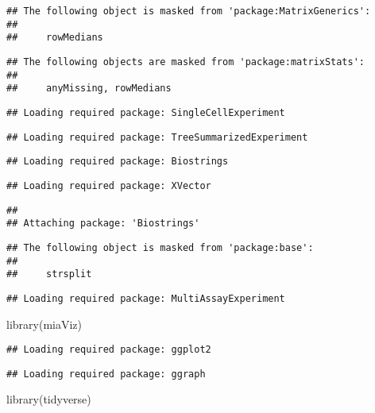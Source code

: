\documentclass[
  oneside]{book}
\newenvironment{Shaded}{\begin{snugshade}}{\end{snugshade}}
\newcommand{\FunctionTok}[1]{\textcolor[rgb]{0.00,0.00,0.00}{#1}}
\newcommand{\NormalTok}[1]{#1}
\begin{document}
\begin{verbatim}
## The following object is masked from 'package:MatrixGenerics':
## 
##     rowMedians
\end{verbatim}

\begin{verbatim}
## The following objects are masked from 'package:matrixStats':
## 
##     anyMissing, rowMedians
\end{verbatim}

\begin{verbatim}
## Loading required package: SingleCellExperiment
\end{verbatim}

\begin{verbatim}
## Loading required package: TreeSummarizedExperiment
\end{verbatim}

\begin{verbatim}
## Loading required package: Biostrings
\end{verbatim}

\begin{verbatim}
## Loading required package: XVector
\end{verbatim}

\begin{verbatim}
## 
## Attaching package: 'Biostrings'
\end{verbatim}

\begin{verbatim}
## The following object is masked from 'package:base':
## 
##     strsplit
\end{verbatim}

\begin{verbatim}
## Loading required package: MultiAssayExperiment
\end{verbatim}

\begin{Shaded}
\begin{Highlighting}[]
\FunctionTok{library}\NormalTok{(miaViz)}
\end{Highlighting}
\end{Shaded}

\begin{verbatim}
## Loading required package: ggplot2
\end{verbatim}

\begin{verbatim}
## Loading required package: ggraph
\end{verbatim}

\begin{Shaded}
\begin{Highlighting}[]
\FunctionTok{library}\NormalTok{(tidyverse)}
\end{Highlighting}
\end{Shaded}
\end{document}

